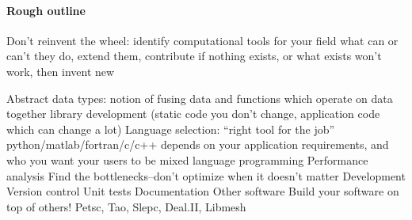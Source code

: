 \documentclass[12 pt]{article}
\begin{document}
\paragraph{Rough outline}

Don’t reinvent the wheel:
identify computational tools for your field
what can or can’t they do, extend them, contribute
if nothing exists, or what exists won’t work, then invent new

Abstract data types: 
notion of fusing data and functions which operate on data together
library development (static code you don’t change, application code which can change a lot)
Language selection: 
“right tool for the job”
python/matlab/fortran/c/c++
depends on your application requirements, and who you want your users to be
mixed language programming
Performance analysis
Find the bottlenecks--don’t optimize when it doesn’t matter
Development
Version control
Unit tests
Documentation
Other software
Build your software on top of others!
Petsc, Tao, Slepc, Deal.II, Libmesh

 
\end{document}
